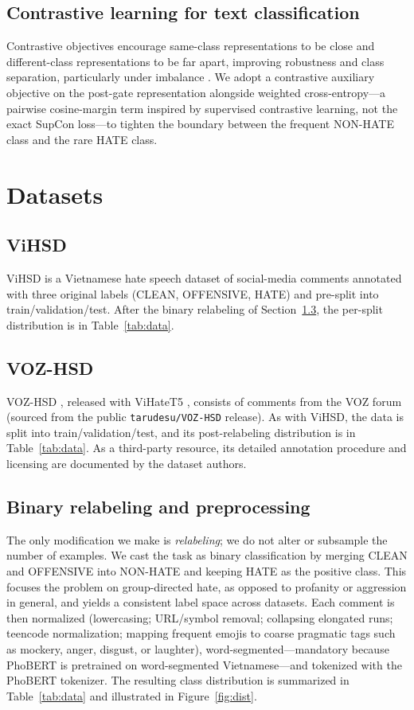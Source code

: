 \documentclass[11pt]{article}
\begin{document}
\subsection{Contrastive learning for text classification}
Contrastive objectives encourage same-class representations to be close and different-class representations to be far apart, improving robustness and class separation, particularly under imbalance \citep{supcon}. We adopt a contrastive auxiliary objective on the post-gate representation alongside weighted cross-entropy---a pairwise cosine-margin term inspired by supervised contrastive learning, not the exact SupCon loss---to tighten the boundary between the frequent NON-HATE class and the rare HATE class.

\section{Datasets}

\subsection{ViHSD}
ViHSD \citep{vihsd} is a Vietnamese hate speech dataset of social-media comments annotated with three original labels (CLEAN, OFFENSIVE, HATE) and pre-split into train/validation/test. After the binary relabeling of Section~\ref{sec:reshape}, the per-split distribution is in Table~\ref{tab:data}.

\subsection{VOZ-HSD}
VOZ-HSD \citep{vozhsd}, released with ViHateT5 \citep{vihatet5}, consists of comments from the VOZ forum (sourced from the public \texttt{tarudesu/VOZ-HSD} release). As with ViHSD, the data is split into train/validation/test, and its post-relabeling distribution is in Table~\ref{tab:data}. As a third-party resource, its detailed annotation procedure and licensing are documented by the dataset authors.

\subsection{Binary relabeling and preprocessing}
\label{sec:reshape}
The only modification we make is \emph{relabeling}; we do not alter or subsample the number of examples. We cast the task as binary classification by merging CLEAN and OFFENSIVE into NON-HATE and keeping HATE as the positive class. This focuses the problem on group-directed hate, as opposed to profanity or aggression in general, and yields a consistent label space across datasets. Each comment is then normalized (lowercasing; URL/symbol removal; collapsing elongated runs; teencode normalization; mapping frequent emojis to coarse pragmatic tags such as mockery, anger, disgust, or laughter), word-segmented---mandatory because PhoBERT is pretrained on word-segmented Vietnamese---and tokenized with the PhoBERT tokenizer. The resulting class distribution is summarized in Table~\ref{tab:data} and illustrated in Figure~\ref{fig:dist}.
\end{document}
